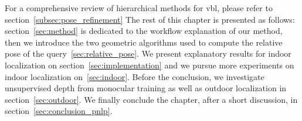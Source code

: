 For a comprehensive review of hierarchical methods for \ac{vbl}, please refer to section~\ref{subsec:pose_refinement} The rest of this chapter is presented as follows: section~\ref{sec:method} is dedicated to the workflow explanation of our method, then we introduce the two geometric algorithms used to compute the relative pose of the query~\ref{sec:relative_pose}. We present explanatory results for indoor localization on section~\ref{sec:implementation} and we pursue more experiments on indoor localization on~\ref{sec:indoor}. Before the conclusion, we investigate unsupervised depth from monocular training as well as outdoor localization in section~\ref{sec:outdoor}. We finally conclude the chapter, after a short discussion, in section~\ref{sec:conclusion_pnlp}.
